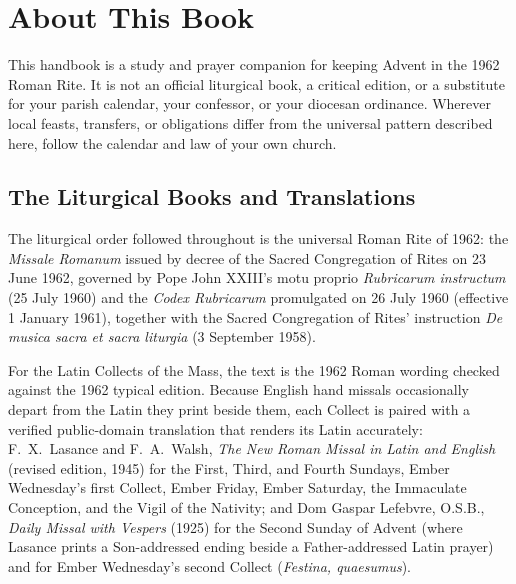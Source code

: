 \section{About This Book}\label{app:about}

This handbook is a study and prayer companion for keeping Advent in the 1962
Roman Rite. It is not an official liturgical book, a critical edition, or a
substitute for your parish calendar, your confessor, or your diocesan
ordinance. Wherever local feasts, transfers, or obligations differ from the
universal pattern described here, follow the calendar and law of your own
church.

\subsection{The Liturgical Books and Translations}

The liturgical order followed throughout is the universal Roman Rite of 1962:
the \textit{Missale Romanum} issued by decree of the Sacred Congregation of
Rites on 23 June 1962, governed by Pope John XXIII's motu proprio
\textit{Rubricarum instructum} (25 July 1960) and the \textit{Codex Rubricarum}
promulgated on 26 July 1960 (effective 1 January 1961), together with the
Sacred Congregation of Rites' instruction \textit{De musica sacra et sacra
liturgia} (3 September 1958).

For the Latin Collects of the Mass, the text is the 1962 Roman wording checked
against the 1962 typical edition. Because English hand missals occasionally
depart from the Latin they print beside them, each Collect is paired with a
verified public-domain translation that renders its Latin accurately:
F.~X.~Lasance and F.~A.~Walsh, \textit{The New Roman Missal in Latin and
English} (revised edition, 1945) for the First, Third, and Fourth Sundays,
Ember Wednesday's first Collect, Ember Friday, Ember Saturday, the Immaculate
Conception, and the Vigil of the Nativity; and Dom Gaspar Lefebvre, O.S.B.,
\textit{Daily Missal with Vespers} (1925) for the Second Sunday of Advent
(where Lasance prints a Son-addressed ending beside a Father-addressed Latin
prayer) and for Ember Wednesday's second Collect (\textit{Festina, quaesumus}).

